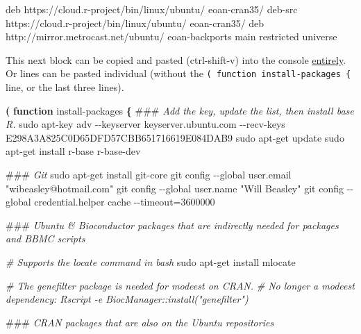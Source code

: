 \documentclass[
]{book}
\newenvironment{Shaded}{\begin{snugshade}}{\end{snugshade}}
\newcommand{\AlertTok}[1]{\textcolor[rgb]{0.94,0.16,0.16}{#1}}
\newcommand{\CommentTok}[1]{\textcolor[rgb]{0.56,0.35,0.01}{\textit{#1}}}
\newcommand{\ExtensionTok}[1]{#1}
\newcommand{\FunctionTok}[1]{\textcolor[rgb]{0.00,0.00,0.00}{#1}}
\newcommand{\KeywordTok}[1]{\textcolor[rgb]{0.13,0.29,0.53}{\textbf{#1}}}
\newcommand{\NormalTok}[1]{#1}
\newcommand{\StringTok}[1]{\textcolor[rgb]{0.31,0.60,0.02}{#1}}
\begin{document}
\begin{Shaded}
\begin{Highlighting}[]
\ExtensionTok{deb}\NormalTok{ https://cloud.r{-}project/bin/linux/ubuntu/ eoan{-}cran35/}
\ExtensionTok{deb{-}src}\NormalTok{ https://cloud.r{-}project/bin/linux/ubuntu/ eoan{-}cran35/}
\ExtensionTok{deb}\NormalTok{ http://mirror.metrocast.net/ubuntu/ eoan{-}backports main restricted universe}
\end{Highlighting}
\end{Shaded}

This next block can be copied and pasted (ctrl-shift-v) into the console \href{https://stackoverflow.com/a/43164204}{entirely}. Or lines can be pasted individual (without the \texttt{(\ function\ install-packages\ \{} line, or the last three lines).

\begin{Shaded}
\begin{Highlighting}[]
\KeywordTok{(} \KeywordTok{function}\FunctionTok{ install{-}packages} \KeywordTok{\{}
  \AlertTok{\#\#\#}\CommentTok{ Add the key, update the list, then install base R.}
  \FunctionTok{sudo}\NormalTok{ apt{-}key adv {-}{-}keyserver keyserver.ubuntu.com {-}{-}recv{-}keys E298A3A825C0D65DFD57CBB651716619E084DAB9}
  \FunctionTok{sudo}\NormalTok{ apt{-}get update}
  \FunctionTok{sudo}\NormalTok{ apt{-}get install r{-}base r{-}base{-}dev}

  \AlertTok{\#\#\#}\CommentTok{ Git}
  \FunctionTok{sudo}\NormalTok{ apt{-}get install git{-}core}
  \FunctionTok{git}\NormalTok{ config {-}{-}global user.email }\StringTok{"wibeasley@hotmail.com"}
  \FunctionTok{git}\NormalTok{ config {-}{-}global user.name }\StringTok{"Will Beasley"}
  \FunctionTok{git}\NormalTok{ config {-}{-}global credential.helper }\StringTok{\textquotesingle{}cache {-}{-}timeout=3600000\textquotesingle{}}

  \AlertTok{\#\#\#}\CommentTok{ Ubuntu \& Bioconductor packages that are indirectly needed for packages and BBMC scripts}

  \CommentTok{\# Supports the \textasciigrave{}locate\textasciigrave{} command in bash}
  \FunctionTok{sudo}\NormalTok{ apt{-}get install mlocate}

  \CommentTok{\# The genefilter package is needed for \textquotesingle{}modeest\textquotesingle{} on CRAN.}
  \CommentTok{\# No longer a modeest dependency: Rscript {-}e \textquotesingle{}BiocManager::install("genefilter")\textquotesingle{}}

  \AlertTok{\#\#\#}\CommentTok{ CRAN packages that are also on the Ubuntu repositories}


\end{Highlighting}
\end{Shaded}
\end{document}
